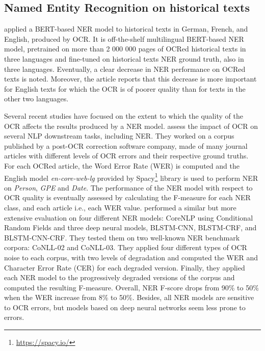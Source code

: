 \subsection{Named Entity Recognition on historical texts}

\cite{Labusch2020NamedED} applied a BERT-based NER model to historical texts in German, French, and English, produced by OCR.
It is off-the-shelf multilingual BERT-based NER model, pretrained on more than 2 000 000 pages of OCRed historical texts in three languages and fine-tuned on historical texts NER ground truth, also in three languages.
Eventually, a clear decrease in NER performance on OCRed texts is noted. Moreover, the article reports that this decrease is more important for English texts for which the OCR is of poorer quality than for texts in the other two languages. 

Several recent studies have focused on the extent to which the quality of the OCR affects the results produced by a NER model.
\cite{van2020assessing} assess the impact of OCR on several NLP downstream tasks, including NER. They worked on a corpus published by a post-OCR correction software company, made of many journal articles with different levels of OCR errors and their respective ground truths.
For each OCRed article, the Word Error Rate (WER) is computed and the English model \textit{en-core-web-lg} provided by Spacy\footnote{\url{https://spacy.io/}} library is used to perform NER on \textit{Person}, \textit{GPE} and \textit{Date}.
The performance of the NER model with respect to OCR quality is eventually assessed by calculating the F-measure for each NER class, and each article i.e., each WER value.
\cite{hamdi2020assessing} performed a similar but more extensive evaluation on four different NER models: CoreNLP using Conditional Random Fields and three deep neural models, BLSTM-CNN, BLSTM-CRF, and BLSTM-CNN-CRF.
They tested them on two well-known NER benchmark corpora: CoNLL-02 and CoNLL-03. They applied four different types of OCR noise to each corpus, with two levels of degradation and computed the WER and Character Error Rate (CER) for each degraded version.
Finally, they applied each NER model to the progressively degraded versions of the corpus and computed the resulting F-measure.
Overall, NER F-score drops from 90\% to 50\% when the WER increase from 8\% to 50\%. Besides, all NER models are sensitive to OCR errors, but models based on deep neural networks seem less prone to errors.

